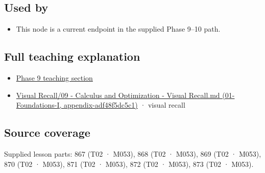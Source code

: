 \subsection{Used by}\label{appendix-54c8f5828387-used-by}

\begin{itemize}
\tightlist
\item
  This node is a current endpoint in the supplied Phase 9--10 path.
\end{itemize}

\subsection{Full teaching explanation}\label{appendix-54c8f5828387-full-teaching-explanation}

\begin{itemize}
\tightlist
\item
  \hyperref[02-foundations-ii-ch026-optimization-and-inverse-problems]{Phase 9 teaching section}
\item
  \href{../01-Foundations-I/main.pdf\#nameddest=appendix-adf48f5dc5c1}{Visual Recall/09 - Calculus and Optimization - Visual Recall.md (01-Foundations-I, appendix-adf48f5dc5c1)} · visual recall
\end{itemize}

\subsection{Source coverage}\label{appendix-54c8f5828387-source-coverage}

Supplied lesson parts: 867 (T02 · M053), 868 (T02 · M053), 869 (T02 · M053), 870 (T02 · M053), 871 (T02 · M053), 872 (T02 · M053), 873 (T02 · M053).
